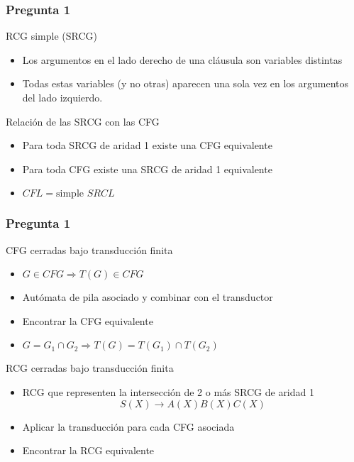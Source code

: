 \documentclass{beamer}
\begin{document}
\begin{frame}
    \frametitle{Pregunta 1}
    
    \begin{block}{RCG simple (SRCG)}
        \begin{itemize}
            \item Los argumentos en el lado derecho de una cláusula son variables distintas
                  \pause
            \item Todas estas variables (y no otras) aparecen una sola vez en los argumentos del lado izquierdo.
        \end{itemize}
    \end{block}
    
    \pause
    
    \begin{block}{Relación de las SRCG con las CFG}
        \begin{itemize}
            \item Para toda SRCG de aridad 1 existe una CFG equivalente
                  \pause
            \item Para toda CFG existe una SRCG de aridad 1 equivalente
                  \pause
            \item $CFL=\text{simple }SRCL$
        \end{itemize}
    \end{block}
\end{frame}

\begin{frame}
    \frametitle{Pregunta 1}
    
    \begin{block}{CFG cerradas bajo transducción finita}
        \begin{itemize}
            \item $G\in CFG\Rightarrow T(G)\in CFG$
                  \pause
            \item Autómata de pila asociado y combinar con el transductor
                  \pause
            \item Encontrar la CFG equivalente
                  \pause
            \item $G=G_1 \cap G_2\Rightarrow T(G)=T(G_1)\cap T(G_2)$
        \end{itemize}
    \end{block}
    
    \pause
    
    \begin{block}{RCG cerradas bajo transducción finita}
        \begin{itemize}
            \item RCG que representen la intersección de 2 o más SRCG de aridad 1
                  \pause
                  $$S(X)\to A(X)B(X)C(X)$$
                  \pause
            \item Aplicar la transducción para cada CFG asociada
                  \pause
            \item Encontrar la RCG equivalente
        \end{itemize}
        
    \end{block}
\end{frame}
\end{document}
